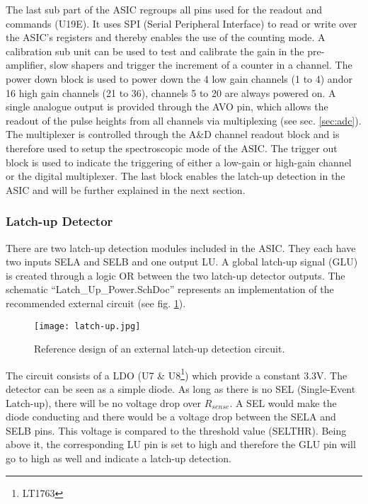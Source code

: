 The last sub part of the ASIC regroups all pins used for the readout and commands (U19E).
It uses SPI (Serial Peripheral Interface) to read or write over the ASIC's registers and thereby enables the use of the counting mode.
A calibration sub unit can be used to test and calibrate the gain in the pre-amplifier, slow shapers and trigger the increment of a counter in a channel.
The power down block is used to power down the 4 low gain channels (1 to 4) and\/or 16 high gain channels (21 to 36), channels 5 to 20 are always powered on.
A single analogue output is provided through the AVO pin, which allows the readout of the pulse heights from all channels via multiplexing (see sec. \ref{sec:adc}).
The multiplexer is controlled through the A\&D channel readout block and is therefore used to setup the spectroscopic mode of the ASIC.
The trigger out block is used to indicate the triggering of either a low-gain or high-gain channel or the digital multiplexer.
The last block enables the latch-up detection in the ASIC and will be further explained in the next section.\cite{Meier2016VATA466}

\subsubsection{Latch-up Detector}
\label{sec:latchup_detector}
There are two latch-up detection modules included in the ASIC.
They each have two inputs SELA and SELB and one output LU.
A global latch-up signal (GLU) is created through a logic OR between the two latch-up detector outputs.
The schematic ``Latch\_Up\_Power.SchDoc'' represents an implementation of the recommended external circuit (see fig. \ref{fig:latch-up}).
\begin{figure}[H]
    \centering
    \texttt{[image: latch-up.jpg]}
    \caption[Latch-up Detection Module]{Reference design of an external latch-up detection circuit.\cite[p. 66, fig. 12]{Meier2016VATA466}}
    \label{fig:latch-up}
\end{figure}

The circuit consists of a LDO (U7 \& U8\footnote{LT1763}) which provide a constant 3.3V.
The detector can be seen as a simple diode.
As long as there is no SEL (Single-Event Latch-up), there will be no voltage drop over $R_{sense}$.
A SEL would make the diode conducting and there would be a voltage drop between the SELA and SELB pins.
This voltage is compared to the threshold value (SELTHR).
Being above it, the corresponding LU pin is set to high and therefore the GLU pin will go to high as well and indicate a latch-up detection.\cite[p. 66-68, fig. 12]{Meier2016VATA466}

